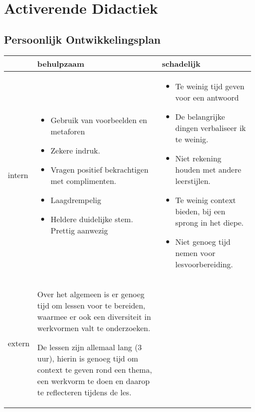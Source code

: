 
\section{Activerende Didactiek}
\subsection{Persoonlijk Ontwikkelingsplan}
\label{sec:didactiek}

\begin{table}[h]
  \begin{center}
  \hspace*{-2cm}
  \begin{tabular}{ l | p{6cm} | p{6cm} }
     \hline
      & behulpzaam & schadelijk \\ \hline
     intern & 
       \begin{itemize}[noitemsep, leftmargin=*]
         \item{Gebruik van voorbeelden en metaforen} 
         \item{Zekere indruk.}
         \item{Vragen positief bekrachtigen met complimenten.}
         \item{Laagdrempelig}
         \item{Heldere duidelijke stem. Prettig aanwezig}
       \end{itemize}
     & 
       \begin{itemize}[noitemsep, leftmargin=*]
         \item{Te weinig tijd geven voor een antwoord}
         \item{De belangrijke dingen verbaliseer ik te weinig.}
         \item{Niet rekening houden met andere leerstijlen.}
         \item{Te weinig context bieden, bij een sprong in het diepe.}
         \item{Niet genoeg tijd nemen voor lesvoorbereiding.}
       \end{itemize}
         \\ \hline
     extern & 
       \begin{itemize}[noitemsep, leftmargin=*]
         \item{Over het algemeen is er genoeg tijd om lessen voor te bereiden, waarmee er ook een diversiteit in werkvormen valt te onderzoeken.
         \item De lessen zijn allemaal lang (3 uur), hierin is genoeg tijd om context te geven rond een thema, een werkvorm te doen en daarop te reflecteren tijdens de les.}

\end{itemize}
\end{tabular}
\end{center}
\end{table}
